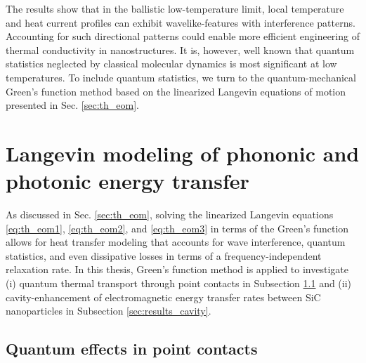 The results show that in the ballistic low-temperature limit, local temperature and heat current profiles can exhibit wavelike-features with interference patterns. Accounting for such directional patterns could enable more efficient engineering of thermal conductivity in nanostructures. It is, however, well known that quantum statistics neglected by classical molecular dynamics is most significant at low temperatures. To include quantum statistics, we turn to the quantum-mechanical Green's function method based on the linearized Langevin equations of motion presented in Sec. \ref{sec:th_eom}.

\section{Langevin modeling of phononic and photonic energy transfer}
\label{sec:results_gf}

As discussed in Sec. \ref{sec:th_eom}, solving the linearized Langevin equations \eqref{eq:th_eom1}, \eqref{eq:th_eom2}, and \eqref{eq:th_eom3} in terms of the Green's function allows for heat transfer modeling that accounts for wave interference, quantum statistics, and even dissipative losses in terms of a frequency-independent relaxation rate. In this thesis, Green's function method is applied to investigate (i) quantum thermal transport through point contacts in Subsection \ref{sec:results_schb} and (ii) cavity-enhancement of electromagnetic energy transfer rates between SiC nanoparticles in Subsection \ref{sec:results_cavity}. %

\subsection{Quantum effects in point contacts}
\label{sec:results_schb}

